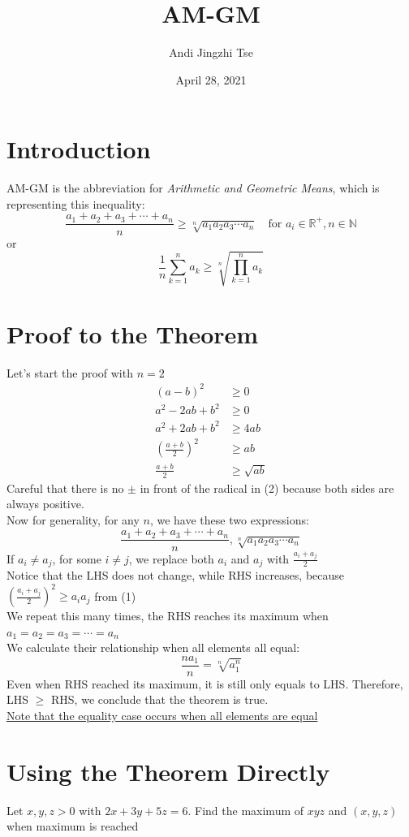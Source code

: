 \documentclass{article}
\title{AM-GM}
\author{Andi Jingzhi Tse}
\date{April 28, 2021}
\theoremstyle{definition}
\begin{document}
\maketitle

\section{Introduction}
AM-GM is the abbreviation for \textit{Arithmetic and Geometric Means}, which is representing this inequality: 
$$\frac{a_1+a_2+a_3+\cdots +a_n}{n}\ge \sqrt[n]{a_1a_2a_3\cdots a_n}\quad\text{for }a_i\in \mathbb{R}^+,n\in \mathbb N$$
or 
\[
\frac 1n\sum_{k=1}^na_k\ge \sqrt[n]{\prod_{k=1}^na_k}
\]

\section{Proof to the Theorem}
Let's start the proof with $n=2$
\begin{align*}
\left(a-b\right)^2&\ge 0\\
a^2-2ab+b^2&\ge 0\\
a^2+2ab+b^2&\ge 4ab\\
\left(\frac{a+b}{2}\right)^2&\ge ab\tag{1}\\
\frac{a+b}{2}&\ge \sqrt{ab}\tag{2}
\end{align*}
Careful that there is no $\pm$ in front of the radical in (2) because both sides are always positive.\\
Now for generality, for any $n$, we have these two expressions:
$$\frac{a_1+a_2+a_3+\cdots +a_n}{n},\sqrt[n]{a_1a_2a_3\cdots a_n}$$
If $a_i\neq a_j$, for some $i\neq j$, we replace both $a_i$ and $a_j$ with $\frac{a_i+a_j}{2}$\\
Notice that the LHS does not change, while RHS increases, because $\left(\frac{a_i+a_j}{2}\right)^2\ge a_ia_j$ from (1)\\
We repeat this many times, the RHS reaches its maximum when  $a_1=a_2=a_3=\cdots=a_n$\\
We calculate their relationship when all elements all equal:
$$\frac{na_1}{n}=\sqrt[n]{a_1^n}$$
Even when RHS reached its maximum, it is still only equals to LHS. Therefore, LHS $\ge$ RHS, we conclude that the theorem is true.\\
\underline{Note that the equality case occurs when all elements are equal} 
\pagebreak

\section{Using the Theorem Directly}
\begin{tcolorbox}
    Let $x,y,z>0$ with $2x+3y+5z=6$. Find the maximum of $xyz$ and $(x,y,z)$ when maximum is reached
\end{tcolorbox}
\end{document}

